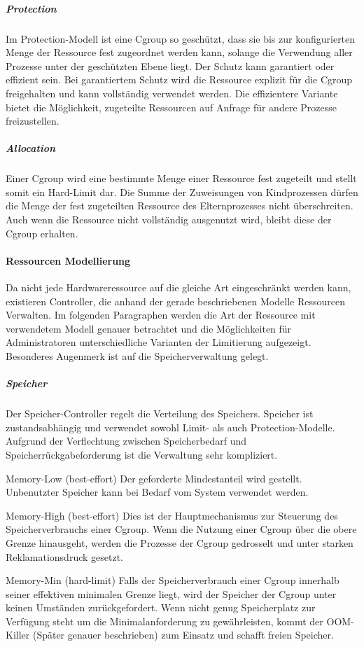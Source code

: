 \subparagraph{Protection}
Im Protection-Modell ist eine Cgroup so geschützt, dass sie bis zur konfigurierten Menge der Ressource fest zugeordnet werden kann, solange die Verwendung aller Prozesse unter der geschützten Ebene liegt. Der Schutz kann garantiert oder effizient sein. Bei garantiertem Schutz wird die Ressource explizit für die Cgroup freigehalten und kann vollständig verwendet werden. Die effizientere Variante bietet die Möglichkeit, zugeteilte Ressourcen auf Anfrage für andere Prozesse freizustellen.


\subparagraph{Allocation}
Einer Cgroup wird eine bestimmte Menge einer Ressource fest zugeteilt und stellt somit ein Hard-Limit dar. Die Summe der Zuweisungen von Kindprozessen dürfen die Menge der fest zugeteilten Ressource des Elternprozesses nicht überschreiten. Auch wenn die Ressource nicht vollständig ausgenutzt wird, bleibt diese der Cgroup erhalten. 


\paragraph{Ressourcen Modellierung}
Da nicht jede Hardwareressource auf die gleiche Art eingeschränkt werden kann, existieren Controller, die anhand der gerade beschriebenen Modelle Ressourcen Verwalten. Im folgenden Paragraphen werden die Art der Ressource mit verwendetem Modell genauer betrachtet und die Möglichkeiten für Administratoren unterschiedliche Varianten der Limitierung aufgezeigt. Besonderes Augenmerk ist auf die Speicherverwaltung gelegt.

\subparagraph{Speicher}
Der Speicher-Controller regelt die Verteilung des Speichers. Speicher ist zustandsabhängig und verwendet sowohl Limit- als auch Protection-Modelle. Aufgrund der Verflechtung zwischen Speicherbedarf und Speicherrückgabeforderung ist die Verwaltung sehr kompliziert.

Memory-Low (best-effort)
Der geforderte Mindestanteil wird gestellt. Unbenutzter Speicher kann bei Bedarf vom System verwendet werden.

Memory-High (best-effort)
Dies ist der Hauptmechanismus zur Steuerung des Speicherverbrauchs einer Cgroup. Wenn die Nutzung einer Cgroup über die obere Grenze hinausgeht, werden die Prozesse der Cgroup gedrosselt und unter starken Reklamationsdruck gesetzt.

Memory-Min (hard-limit)
Falls der Speicherverbrauch einer Cgroup innerhalb seiner effektiven minimalen Grenze liegt, wird der Speicher der Cgroup unter keinen Umständen zurückgefordert. Wenn nicht genug Speicherplatz zur Verfügung steht um die Minimalanforderung zu gewährleisten, kommt der OOM-Killer (Später genauer beschrieben) zum Einsatz und schafft freien Speicher.

